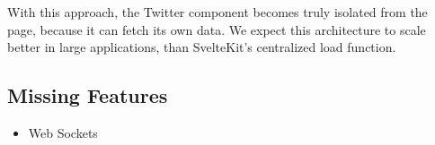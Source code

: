 With this approach, the Twitter component becomes truly isolated from the page, because it can fetch its own data. We expect this architecture to scale better in large applications, than SvelteKit's centralized load function.

\subsection{Missing Features}

\begin{itemize}
    \item Web Sockets
\end{itemize}


